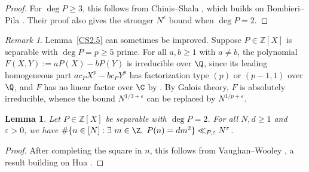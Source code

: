 \documentclass[reqno, 12pt]{amsart}
\theoremstyle{plain}
\newtheorem{lemma}[theorem]{Lemma}
\theoremstyle{definition}
\theoremstyle{remark}
\newtheorem*{remark}{Remark}
\renewcommand{\ge}{\geqslant}
\begin{document}
\begin{proof}
For $\deg{P}\ge 3$, this follows from Chinis--Shala \cite[Lemma~2.5]{CS25},
which builds on Bombieri--Pila \cite{BP}.
Their proof also gives the stronger $N^\varepsilon$ bound
when $\deg{P} = 2$.
\end{proof}

\begin{remark}
Lemma~\ref{CS2.5} can sometimes be improved.
Suppose $P\in \mathbb{Z}[X]$ is separable with $\deg{P} = p \ge 5$ prime.
For all $a,b\ge 1$ with $a\ne b$,
the polynomial $F(X,Y) := aP(X) - bP(Y)$
is irreducible over $\Q$,
since its leading homogeneous part $ac_PX^p - bc_PY^p$
has factorization type $(p)$ or $(p-1,1)$ over $\Q$,
and $F$ has no linear factor over $\C$ by \cite[Lemma~2.5]{WX}.
By Galois theory, $F$ is absolutely irreducible,
whence the bound $N^{1/3+\varepsilon}$ can be replaced by $N^{1/p+\varepsilon}$.
\end{remark}


\begin{lemma}
\label{weak-quadratic}
Let $P\in \mathbb{Z}[X]$ be separable with $\deg{P} = 2$.
For all $N,d\ge 1$ and $\varepsilon>0$,
we have $\#\{n\in [N]: \exists~ m\in \Z,\; P(n) = dm^2\} \ll_{P,\varepsilon} N^\varepsilon$.
\end{lemma}

\begin{proof}
After completing the square in $n$,
this follows from Vaughan--Wooley \cite[Lemma~3.5]{VaughanWooleyActaMath1995},
a result building on Hua \cite[Chapter~11]{Hua}.
\end{proof}
\end{document}
